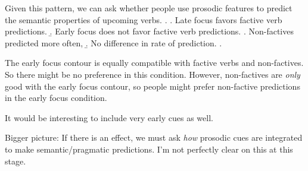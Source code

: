 \documentclass[11pt]{article}
\begin{document}
Given this pattern, we can ask whether people use prosodic features to predict the semantic properties of upcoming verbs.
\ex. 
\a. Late focus favors factive verb predictions.
\b. Early focus does not favor factive verb predictions.
\a. Non-factives predicted more often, 
\b. No difference in rate of prediction.
\z.

The early focus contour is equally compatible with factive verbs and non-factives. So there might be no preference in this condition. However, non-factives are \emph{only} good with the early focus contour, so people might prefer non-factive predictions in the early focus condition.

It would be interesting to include very early cues as well.

Bigger picture: If there is an effect, we must ask \emph{how} prosodic cues are integrated to make semantic/pragmatic predictions. I'm not perfectly clear on this at this stage.  
\end{document}
